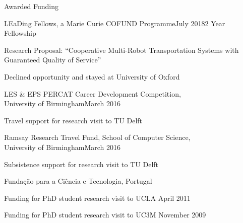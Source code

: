 
\begin{rSection}{Awarded Funding}

\begin{rSubsection}{ LEaDing Fellows, a Marie Curie COFUND Programme}{July 2018}{2 Year Fellowship }{}
\item Research Proposal: ``Cooperative Multi-Robot Transportation Systems with Guaranteed Quality of Service''
\item Declined opportunity and stayed at University of Oxford
\end{rSubsection}

\begin{rSubsection}{ LES \& EPS PERCAT Career Development Competition,\\ University of Birmingham}{March 2016}{}{}
\item Travel support for research visit to TU Delft\\
\end{rSubsection}

\begin{rSubsection}{ Ramsay Research Travel Fund, School of Computer Science, \\ University of Birmingham}{March 2016}{}{}
\item Subsistence support for research visit to TU Delft \\
\end{rSubsection} 

\begin{rSubsection}{ Funda\c{c}\~{a}o para a Ci\^{e}ncia e Tecnologia, Portugal}{}{}{}
\item Funding for PhD student research visit to UCLA \hfill April 2011\\

\item Funding for PhD student research visit to UC3M \hfill November 2009\\
\end{rSubsection}

\end{rSection}

